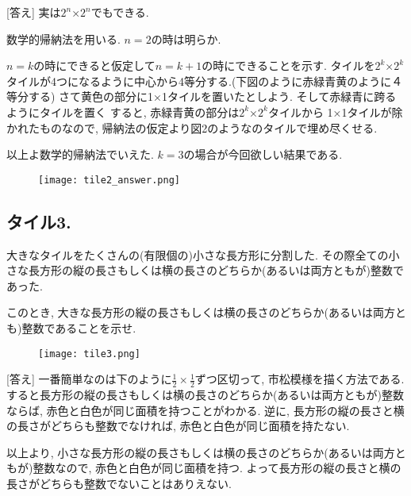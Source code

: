 \documentclass[dvipdfmx,a4paper,12pt]{article} %
\theoremstyle{definition}
\theoremstyle{remark}
\numberwithin{equation}{section}
\begin{document}
[答え]
実は$2^n$×$2^n$でもできる.

数学的帰納法を用いる. 
$n=2$の時は明らか. 

$n=k$の時にできると仮定して$n=k+1$の時にできることを示す. 
タイルを$2^k$×$2^k$タイルが4つになるように中心から4等分する.(下図のように赤緑青黄のように４等分する)
さて黄色の部分に1×1タイルを置いたとしよう. 
そして赤緑青に跨るようにタイルを置く
すると, 赤緑青黄の部分は$2^k$×$2^k$タイルから 1×1タイルが除かれたものなので, 帰納法の仮定より図2のようなのタイルで埋め尽くせる. 

以上よ数学的帰納法でいえた. $k=3$の場合が今回欲しい結果である. 

\begin{figure}[htbp]
\begin{center}
\texttt{[image: tile2\_answer.png]}
\end{center}
\end{figure}

\subsection{タイル3. }


\begin{tcolorbox}[mybox]
大きなタイルをたくさんの(有限個の)小さな長方形に分割した. 
その際全ての小さな長方形の縦の長さもしくは横の長さのどちらか(あるいは両方ともが)整数であった.

\vspace{5pt}
このとき, 大きな長方形の縦の長さもしくは横の長さのどちらか(あるいは両方とも)整数であることを示せ.

\end{tcolorbox}


\begin{figure}[htbp]
\begin{center}
\texttt{[image: tile3.png]}
\end{center}
\end{figure}

[答え]
一番簡単なのは下のように$\frac{1}{2} \times \frac{1}{2}$ずつ区切って, 市松模様を描く方法である. 
すると長方形の縦の長さもしくは横の長さのどちらか(あるいは両方ともが)整数ならば, 赤色と白色が同じ面積を持つことがわかる. 
逆に, 長方形の縦の長さと横の長さがどちらも整数でなければ, 赤色と白色が同じ面積を持たない. 

以上より, 小さな長方形の縦の長さもしくは横の長さのどちらか(あるいは両方ともが)整数なので, 赤色と白色が同じ面積を持つ. よって長方形の縦の長さと横の長さがどちらも整数でないことはありえない. 
\end{document}
